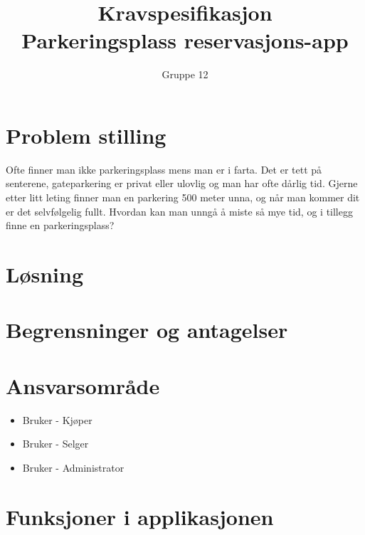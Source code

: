 \documentclass[12pt]{article}
\begin{document}
\title{%
    Kravspesifikasjon\\
    \large Parkeringsplass reservasjons-app }
\author{Gruppe 12}
\date{}
\maketitle

\newpage

\tableofcontents

\newpage

\section{Problem stilling}

Ofte finner man ikke parkeringsplass mens man er i farta. Det er tett på senterene, gateparkering er privat eller ulovlig og man har ofte dårlig tid. Gjerne etter litt leting finner man en parkering 500 meter unna, og når man kommer dit er det selvfølgelig fullt. Hvordan kan man unngå å miste så mye tid, og i tillegg finne en parkeringsplass?

\section{Løsning}


\section{Begrensninger og antagelser}

\section{Ansvarsområde}

    \begin{itemize}
        \item Bruker - Kjøper
        \item Bruker - Selger
        \item Bruker - Administrator
    \end{itemize}

\section{Funksjoner i applikasjonen}
\end{document}
